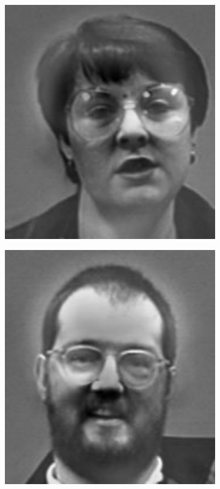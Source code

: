\begin{figure}
\begin{subfigure}[b]{0.3\textwidth}
\includegraphics[width=\textwidth]{figures/differenceFace0.pdf}
\end{subfigure}
\begin{subfigure}[b]{0.3\textwidth}
\includegraphics[width=\textwidth]{figures/differenceFace1.pdf}

\end{subfigure}
\end{figure}

